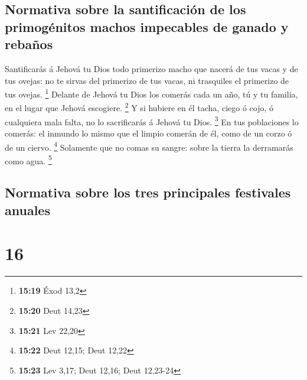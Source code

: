 \hypertarget{normativa-sobre-la-santificaciuxf3n-de-los-primoguxe9nitos-machos-impecables-de-ganado-y-rebauxf1os}{%
\subsection{Normativa sobre la santificación de los primogénitos machos
impecables de ganado y
rebaños}\label{normativa-sobre-la-santificaciuxf3n-de-los-primoguxe9nitos-machos-impecables-de-ganado-y-rebauxf1os}}

 Santificarás á Jehová tu Dios todo primerizo macho que
nacerá de tus vacas y de tus ovejas: no te sirvas del primerizo de tus
vacas, ni trasquiles el primerizo de tus ovejas. \footnote{\textbf{15:19}
  Éxod 13,2}  Delante de Jehová tu Dios los comerás cada un
año, tú y tu familia, en el lugar que Jehová escogiere. \footnote{\textbf{15:20}
  Deut 14,23}  Y si hubiere en él tacha, ciego ó cojo, ó
cualquiera mala falta, no lo sacrificarás á Jehová tu Dios. \footnote{\textbf{15:21}
  Lev 22,20}  En tus poblaciones lo comerás: el inmundo lo
mismo que el limpio comerán de él, como de un corzo ó de un ciervo.
\footnote{\textbf{15:22} Deut 12,15; Deut 12,22}  Solamente
que no comas su sangre: sobre la tierra la derramarás como agua.
\footnote{\textbf{15:23} Lev 3,17; Deut 12,16; Deut 12,23-24}

\hypertarget{normativa-sobre-los-tres-principales-festivales-anuales}{%
\subsection{Normativa sobre los tres principales festivales
anuales}\label{normativa-sobre-los-tres-principales-festivales-anuales}}

\hypertarget{section-15}{%
\section{16}\label{section-15}}

